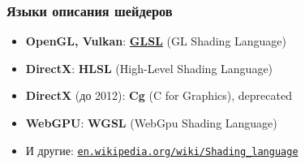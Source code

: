 \documentclass[10pt]{beamer}
\begin{document}
\begin{frame}[fragile]
\frametitle{Языки описания шейдеров}
\begin{itemize}
\item \textbf{OpenGL, Vulkan}: \textbf{\alert{\underline{GLSL}}} (GL Shading Language)
\pause
\item \textbf{DirectX}: \textbf{HLSL} (High-Level Shading Language)
\pause
\item \textbf{DirectX} (до 2012): \textbf{Cg} (C for Graphics), deprecated
\pause
\item \textbf{WebGPU}: \textbf{WGSL} (WebGpu Shading Language)
\pause
\item И другие: \href{https://en.wikipedia.org/wiki/Shading_language}{\nolinkurl{en.wikipedia.org/wiki/Shading\_language}}
\end{itemize}
\end{frame}
\end{document}
